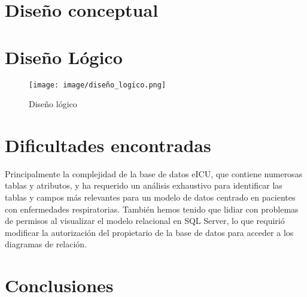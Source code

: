 \documentclass[12pt, a4paper, twoside]{article}
\begin{document}
	\section{Diseño conceptual}
	
	
	
	
	\section{Diseño Lógico}
	
	\begin{figure}[h!]
		\centering
		\texttt{[image: image/diseño\_logico.png]}
		\caption{Diseño lógico}
		\label{fig:11}
	\end{figure}
	
	\section{Dificultades encontradas}
	
	Principalmente la complejidad de la base de datos eICU, que contiene numerosas tablas y atributos, y ha requerido un análisis exhaustivo para identificar las tablas y campos más relevantes para un modelo de datos centrado en pacientes con enfermedades respiratorias. También hemos tenido que lidiar con problemas de permisos al visualizar el modelo relacional en SQL Server, lo que requirió modificar la autorización del propietario de la base de datos para acceder a los diagramas de relación.
	
	\section{Conclusiones}

	
	\printbibliography
	
	
	
	
\end{document}
